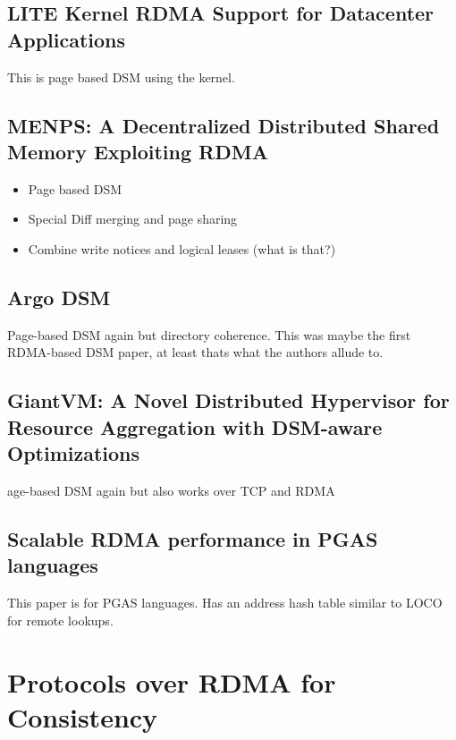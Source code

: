 \documentclass[sigplan,nonacm]{acmart}
\begin{document}
    \subsection{LITE Kernel RDMA Support for Datacenter Applications}
    This is page based DSM using the kernel. \cite{Tsai-SOSP-2017}

    \subsection{MENPS: A Decentralized Distributed Shared Memory Exploiting RDMA}
        \begin{itemize}
            \item Page based DSM
            \item Special Diff merging and page sharing
            \item Combine write notices and logical leases (what is that?)\cite{Endo-IPDRM-2020}
        \end{itemize}

    \subsection{Argo DSM}
    Page-based DSM again but directory coherence. This was maybe the first RDMA-based DSM paper, 
    at least thats what the authors allude to.\cite{Kaxiras-HPDC-2015}

    \subsection {GiantVM: A Novel Distributed Hypervisor for Resource Aggregation with DSM-aware Optimizations}
    age-based DSM again but also works over TCP and RDMA\cite{Jia-ACO-2022}

    \subsection{Scalable RDMA performance in PGAS languages}
    This paper is for PGAS languages. Has an address hash table similar to LOCO for remote lookups.\cite{Farreras-IPDPS-2009}
\section{Protocols over RDMA for Consistency}
\end{document}

